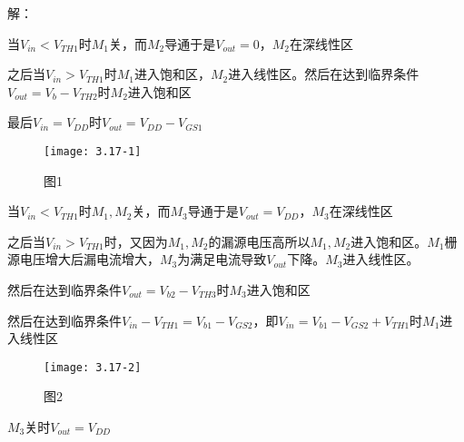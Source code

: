 
 



解：

\scalebox{3}{（a）}

当$V_{in}<V_{TH1}$时$M_1$关，而$M_2$导通于是$V_{out}=0$，$M_2$在深线性区

之后当$V_{in}>V_{TH1}$时$M_1$进入饱和区，$M_2$进入线性区。然后在达到临界条件$V_{out}=V_{b}-V_{TH2}$时$M_2$进入饱和区

最后$V_{in}=V_{DD}$时$V_{out}=V_{DD}-V_{GS1}$

		\begin{figure}[H] %
	\begin{minipage}{\linewidth}
		\texttt{[image: 3.17-1]}
	\end{minipage}
	\caption*{图1} %
\end{figure}


\color{black}{}

\scalebox{3}{（b）}

当$V_{in}<V_{TH1}$时$M_1,M_2$关，而$M_3$导通于是$V_{out}=V_{DD}$，$M_3$在深线性区

之后当$V_{in}>V_{TH1}$时，又因为$M_1,M_2$的漏源电压高所以$M_1,M_2$进入饱和区。$M_1$栅源电压增大后漏电流增大，$M_3$为满足电流导致$V_{out}$下降。$M_3$进入线性区。

然后在达到临界条件$V_{out}=V_{b2}-V_{TH3}$时$M_3$进入饱和区


然后在达到临界条件$V_{in}-V_{TH1}=V_{b1}-V_{GS2}$，即$V_{in}=V_{b1}-V_{GS2}+V_{TH1}$时$M_1$进入线性区

		\begin{figure}[H] %
	\begin{minipage}{\linewidth}
		\texttt{[image: 3.17-2]}
	\end{minipage}
	\caption*{图2} %
\end{figure}

\scalebox{3}{（c）}

$M_3$关时$V_{out}=V_{DD}$

